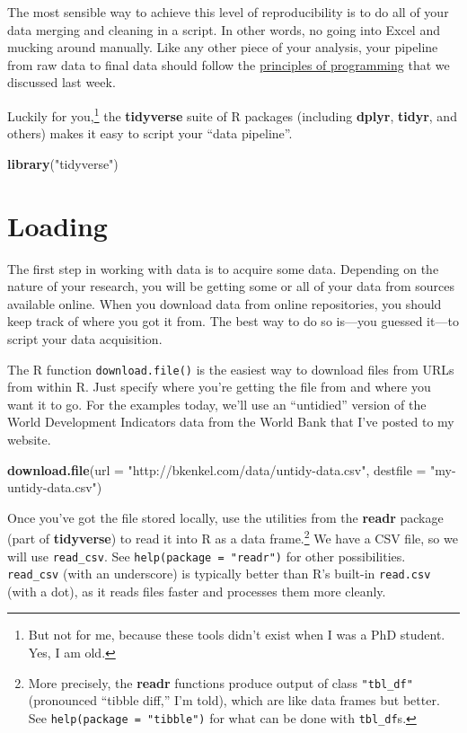 \documentclass[
  12pt,
  oneside,openany]{book}
\newenvironment{Shaded}{\begin{snugshade}}{\end{snugshade}}
\newcommand{\DataTypeTok}[1]{\textcolor[rgb]{0.13,0.29,0.53}{#1}}
\newcommand{\KeywordTok}[1]{\textcolor[rgb]{0.13,0.29,0.53}{\textbf{#1}}}
\newcommand{\NormalTok}[1]{#1}
\newcommand{\StringTok}[1]{\textcolor[rgb]{0.31,0.60,0.02}{#1}}
\begin{document}
The most sensible way to achieve this level of reproducibility is to do all of your data merging and cleaning in a script. In other words, no going into Excel and mucking around manually. Like any other piece of your analysis, your pipeline from raw data to final data should follow the \protect\hyperlink{programming}{principles of programming} that we discussed last week.

Luckily for you,\footnote{But not for me, because these tools didn't exist when I was a PhD student. Yes, I am old.} the \textbf{tidyverse} suite of R packages (including \textbf{dplyr}, \textbf{tidyr}, and others) makes it easy to script your ``data pipeline''.

\begin{Shaded}
\begin{Highlighting}[]
\KeywordTok{library}\NormalTok{(}\StringTok{"tidyverse"}\NormalTok{)}
\end{Highlighting}
\end{Shaded}

\hypertarget{loading}{%
\section{Loading}\label{loading}}

The first step in working with data is to acquire some data. Depending on the nature of your research, you will be getting some or all of your data from sources available online. When you download data from online repositories, you should keep track of where you got it from. The best way to do so is---you guessed it---to script your data acquisition.

The R function \texttt{download.file()} is the easiest way to download files from URLs from within R. Just specify where you're getting the file from and where you want it to go. For the examples today, we'll use an ``untidied'' version of the World Development Indicators data from the World Bank that I've posted to my website.

\begin{Shaded}
\begin{Highlighting}[]
\KeywordTok{download.file}\NormalTok{(}\DataTypeTok{url =} \StringTok{"http://bkenkel.com/data/untidy{-}data.csv"}\NormalTok{,}
              \DataTypeTok{destfile =} \StringTok{"my{-}untidy{-}data.csv"}\NormalTok{)}
\end{Highlighting}
\end{Shaded}

Once you've got the file stored locally, use the utilities from the \textbf{readr} package (part of \textbf{tidyverse}) to read it into R as a data frame.\footnote{More precisely, the \textbf{readr} functions produce output of class \texttt{"tbl\_df"} (pronounced ``tibble diff,'' I'm told), which are like data frames but better. See \texttt{help(package\ =\ "tibble")} for what can be done with \texttt{tbl\_df}s.} We have a CSV file, so we will use \texttt{read\_csv}. See \texttt{help(package\ =\ "readr")} for other possibilities.
\texttt{read\_csv} (with an underscore) is typically better than R's built-in \texttt{read.csv} (with a dot), as it reads files faster and processes them more cleanly.
\end{document}
